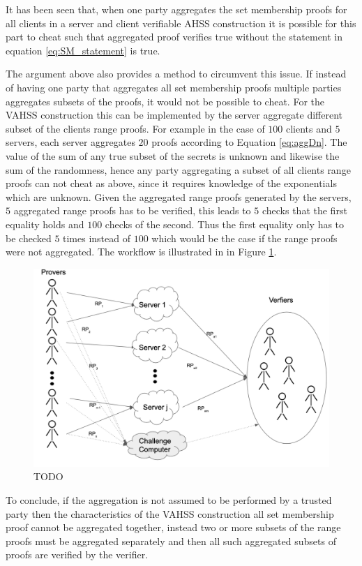 It has been seen that, when one party aggregates the set membership proofs for all clients in a server and client verifiable AHSS construction it is possible for this part to cheat such that aggregated proof verifies true without the statement in equation \eqref{eq:SM_statement} is true.

The argument above also provides a method to circumvent this issue. If instead of having one party that aggregates all set membership proofs multiple parties aggregates subsets of the proofs, it would not be possible to cheat. For the VAHSS construction this can be implemented by the server aggregate different subset of the clients range proofs. For example in the case of $100$ clients and $5$ servers, each server aggregates $20$ proofs according to Equation \eqref{eq:aggDn}. The value of the sum of any true subset of the secrets is unknown and likewise the sum of the randomness, hence any party aggregating a subset of all clients range proofs can not cheat as above, since it requires knowledge of the exponentials which are unknown. Given the aggregated range proofs generated by the servers, $5$ aggregated range proofs has to be verified, this leads to $5$ checks that the first equality holds and $100$ checks of the second. Thus the first equality only has to be checked $5$ times instead of $100$ which would be the case if the range proofs were not aggregated. 
The workflow is illustrated in in Figure \ref{fig:workflow}. %



 \begin{figure}[]
\caption{TODO}
\label{fig:workflow}
\includegraphics[width=\linewidth]{./figure/workflow_challanger.png}
\end{figure}
To conclude, if the aggregation is not assumed to be performed by a trusted party then  the characteristics of the VAHSS construction all set membership proof cannot be aggregated together, instead two or more subsets of the range proofs must be aggregated separately and then all such aggregated subsets of  proofs are verified by the verifier. 



